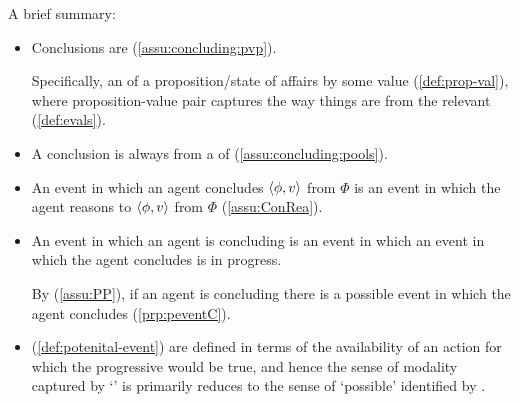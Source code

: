 \begin{note}
  A brief summary:
  \begin{itemize}
  \item
    Conclusions are  (\autoref{assu:concluding:pvp}).

    Specifically, an \eval{} of a proposition/state of affairs by some value (\autoref{def:prop-val}), where proposition-value pair captures the way things are from the relevant \agpe{} (\autoref{def:evals}).
  \item
    A conclusion is always from a  of  (\autoref{assu:concluding:pools}).
  \item
    An event in which an agent concludes \(\langle \phi, v \rangle\) from \(\Phi\) is an event in which the agent reasons to \(\langle \phi, v \rangle\) from \(\Phi\) (\autoref{assu:ConRea}).
  \item
    An event in which an agent is concluding is an event in which an event in which the agent concludes is in progress.

    By \assuPP{} (\autoref{assu:PP}), if an agent is concluding there is a possible event in which the agent concludes (\autoref{prp:peventC}).
  \item
     (\autoref{def:potenital-event}) are defined in terms of the availability of an action for which the progressive would be true, and hence the sense of modality captured by `' is primarily reduces to the sense of `possible' identified by \assuPP{}.
  \end{itemize}
\end{note}





